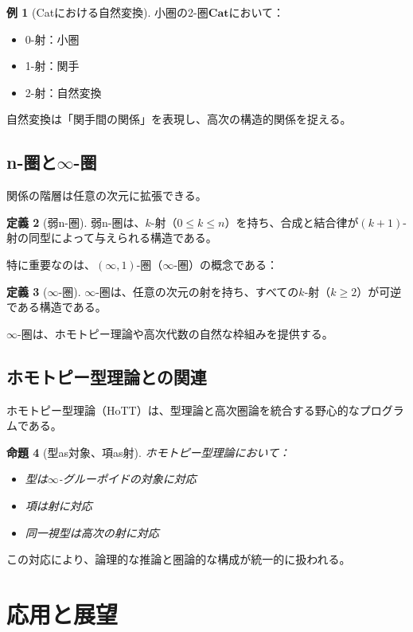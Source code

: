 \documentclass[11pt,a4paper,twocolumn]{ltjsarticle}
\theoremstyle{definition}
\newtheorem{definition}{定義}[section]
\newtheorem{example}[definition]{例}
\theoremstyle{plain}
\newtheorem{proposition}[definition]{命題}
\newcommand{\Cat}{\mathbf{Cat}}
\begin{document}
\begin{example}[Catにおける自然変換]
小圏の2-圏$\Cat$において：
\begin{itemize}
\item 0-射：小圏
\item 1-射：関手
\item 2-射：自然変換
\end{itemize}
自然変換は「関手間の関係」を表現し、高次の構造的関係を捉える。
\end{example}

\subsection{n-圏と$\infty$-圏}

関係の階層は任意の次元に拡張できる。

\begin{definition}[弱n-圏]
弱n-圏は、$k$-射（$0 \leq k \leq n$）を持ち、合成と結合律が$(k+1)$-射の同型によって与えられる構造である。
\end{definition}

特に重要なのは、$(\infty, 1)$-圏（$\infty$-圏）の概念である：

\begin{definition}[$\infty$-圏]
$\infty$-圏は、任意の次元の射を持ち、すべての$k$-射（$k \geq 2$）が可逆である構造である。
\end{definition}

$\infty$-圏は、ホモトピー理論や高次代数の自然な枠組みを提供する。

\subsection{ホモトピー型理論との関連}

ホモトピー型理論（HoTT）は、型理論と高次圏論を統合する野心的なプログラムである。

\begin{proposition}[型as対象、項as射]
ホモトピー型理論において：
\begin{itemize}
\item 型は$\infty$-グルーポイドの対象に対応
\item 項は射に対応
\item 同一視型は高次の射に対応
\end{itemize}
\end{proposition}

この対応により、論理的な推論と圏論的な構成が統一的に扱われる。

\section{応用と展望}
\end{document}
